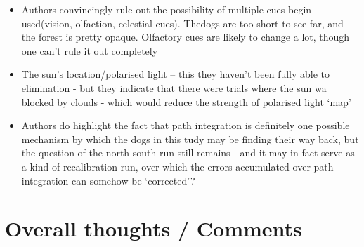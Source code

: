 \documentclass[
]{book}
\providecommand{\tightlist}{%
  \setlength{\itemsep}{0pt}\setlength{\parskip}{0pt}}
\begin{document}
\begin{itemize}
\tightlist
\item
  Authors convincingly rule out the possibility of multiple cues begin used(vision, olfaction, celestial cues). Thedogs are too short to see far, and the forest is pretty opaque. Olfactory cues are likely to change a lot, though one can't rule it out completely
\item
  The sun's location/polarised light -- this they haven't been fully able to elimination - but they indicate that there were trials where the sun wa blocked by clouds - which would reduce the strength of polarised light `map'
\item
  Authors do highlight the fact that path integration is definitely one possible mechanism by which the dogs in this tudy may be finding their way back, but the question of the north-south run still remains - and it may in fact serve as a kind of recalibration run, over which the errors accumulated over path integration can somehow be `corrected'?
\end{itemize}

\hypertarget{overall-thoughts-comments}{%
\section{Overall thoughts / Comments}\label{overall-thoughts-comments}}
\end{document}
